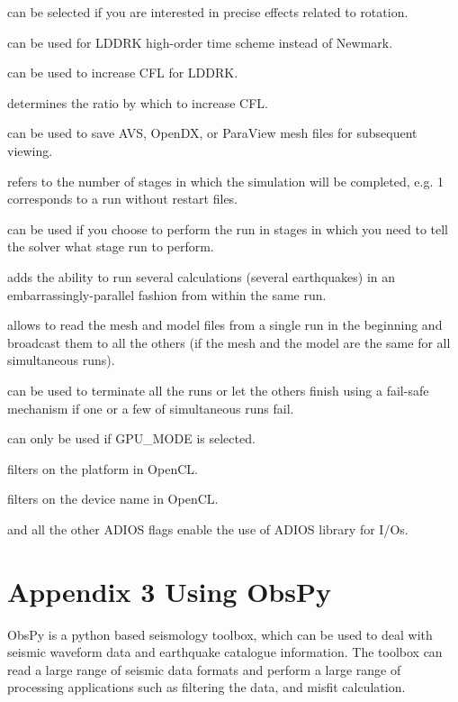 \documentclass[english]{book}
\begin{document}
 can be selected if you are
interested in precise effects related to rotation.

 can be used for LDDRK high-order time scheme instead of
Newmark.

 can be used to increase CFL for LDDRK.

 determines the ratio by which to
increase CFL.

 can be used to save AVS, OpenDX, or ParaView mesh
files for subsequent viewing.

 refers to the number of stages in which the
simulation will be completed, e.g. 1 corresponds to a run without
restart files.

 can be used if you choose to perform the run
in stages in which you need to tell the solver what stage run to
perform.

 adds the ability to run several
calculations (several earthquakes) in an embarrassingly-parallel fashion
from within the same run.

 allows to read the mesh and model
files from a single run in the beginning and broadcast them to all the
others (if the mesh and the model are the same for all simultaneous
runs).

 can be used to terminate all the runs or
let the others finish using a fail-safe mechanism if one or a few of
simultaneous runs fail.

 can only be used if GPU\_MODE is selected.

 filters on the platform in OpenCL.

 filters on the device name in OpenCL.

 and all the other ADIOS flags enable the use of ADIOS
library for I/Os.


\chapter{Appendix 3  \textendash{} Using ObsPy}
\label{\detokenize{Appendix3::doc}}\label{\detokenize{Appendix3:appendix-3-using-obspy}}
ObsPy is a python based seismology toolbox, which can be used to deal
with seismic waveform data and earthquake catalogue information. The
toolbox can read a large range of seismic data formats and perform a
large range of processing applications such as filtering the data, and
misfit calculation.
\end{document}

